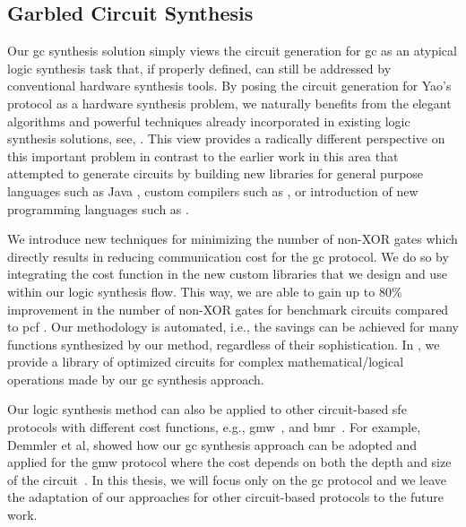 \subsection{Garbled Circuit Synthesis}
Our \acrfull{gc} synthesis solution simply views the circuit generation for \acrshort{gc} as an atypical logic synthesis task that, if properly defined, can still be addressed by conventional hardware synthesis tools.
By posing the circuit generation for Yao's protocol as a hardware synthesis problem, we naturally benefits from the elegant algorithms and powerful techniques already incorporated in existing logic synthesis solutions, see, \cite{sentovich1992sis,micheli1994synthesis,devadas1994logic,brayton1987mis}.
This view provides a radically different perspective on this important problem in contrast to the earlier work in this area that attempted to generate circuits by building new libraries for general purpose languages such as Java \cite{huang2011faster,malka2011vmcrypt}, custom compilers such as \cite{kreuter2013pcf,franz2014cbmc}, or introduction of new programming languages such as \cite{malkhi2004fairplay,rastogi2014wysteria}.

We introduce new techniques for minimizing the number of non-XOR gates which directly results in reducing communication cost for the \acrshort{gc} protocol.
We do so by integrating the cost function in the new custom libraries that we design and use within our logic synthesis flow.
This way, we are able to gain up to $80\%$ improvement in the number of non-XOR gates for benchmark circuits compared to \gls{pcf} \cite{kreuter2013pcf}.
Our methodology is automated, i.e., the savings can be achieved for many functions synthesized by our method, regardless of their sophistication.
In , we provide a library of optimized circuits for complex mathematical/logical operations made by our \acrshort{gc} synthesis approach.

Our logic synthesis method can also be applied to other circuit-based \acrshort{sfe} protocols with different cost functions, e.g., \acrfull{gmw}~\cite{goldreich1987play}, and \acrfull{bmr}~\cite{beaver1990round}.
For example, Demmler et al, showed how our \acrshort{gc} synthesis approach can be adopted and applied for the \acrshort{gmw} protocol where the cost depends on both the depth and size of the circuit~\cite{demmler2015automated}.
In this thesis, we will focus only on the \acrshort{gc} protocol and we leave the adaptation of our approaches for other circuit-based protocols to the future work.

